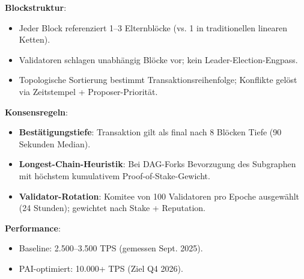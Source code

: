 \documentclass[11pt]{article}
\begin{document}
\textbf{Blockstruktur}:
\begin{itemize}[noitemsep]
  \item Jeder Block referenziert 1--3 Elternblöcke (vs. 1 in traditionellen linearen Ketten).
  \item Validatoren schlagen unabhängig Blöcke vor; kein Leader-Election-Engpass.
  \item Topologische Sortierung bestimmt Transaktionsreihenfolge; Konflikte gelöst via Zeitstempel + Proposer-Priorität.
\end{itemize}

\textbf{Konsensregeln}:
\begin{itemize}[noitemsep]
  \item \textbf{Bestätigungstiefe}: Transaktion gilt als final nach 8 Blöcken Tiefe (90 Sekunden Median).
  \item \textbf{Longest-Chain-Heuristik}: Bei DAG-Forks Bevorzugung des Subgraphen mit höchstem kumulativem Proof-of-Stake-Gewicht.
  \item \textbf{Validator-Rotation}: Komitee von 100 Validatoren pro Epoche ausgewählt (24 Stunden); gewichtet nach Stake + Reputation.
\end{itemize}

\textbf{Performance}:
\begin{itemize}[noitemsep]
  \item Baseline: 2.500--3.500 TPS (gemessen Sept. 2025).
  \item PAI-optimiert: 10.000+ TPS (Ziel Q4 2026).
\end{itemize}
\end{document}
